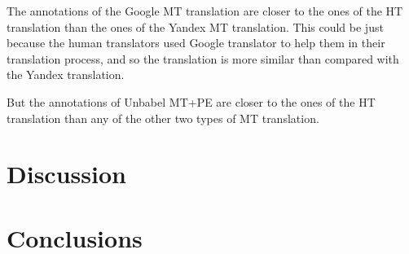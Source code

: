 The annotations of the Google MT translation are closer to the ones of the HT translation than the ones of the Yandex MT translation. This could be just because the human translators used Google translator to help them in their translation process, and so the translation is more similar than compared with the Yandex translation. 

But the annotations of Unbabel MT+PE are closer to the ones of the HT translation than any of the other two types of MT translation. 


\section{Discussion}





\section{Conclusions}




  
